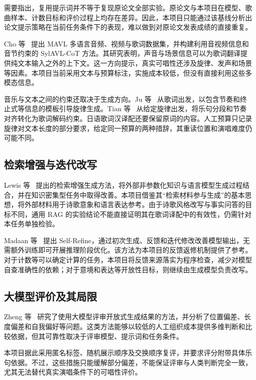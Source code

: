 \documentclass[12pt, a4paper]{ctexart}
\numberwithin{table}{section}
\numberwithin{figure}{section}
\begin{document}
需要指出，复用提示词并不等于复现原论文全部实验。原论文与本项目在模型、歌曲样本、计数目标和评价过程上均存在差异。因此，本项目只能通过该基线分析出论文提示策略在当前任务条件下的表现，难以做到对原论文发表成绩的直接重复。

Cho 等~\cite{cho-etal-2025-mavl} 提出 MAVL 多语言音频、视频与歌词数据集，并构建利用音视频信息和音节约束的 SylAVL-CoT 方法。其研究表明，声音与场景信息可以为歌词翻译提供纯文本输入之外的上下文。这一方向提示，真实可唱性还涉及旋律、发声和场景等因素。本项目当前采用文本与预算标注，实施成本较低，但没有直接利用这些多模态信息。

音乐与文本之间的约束还取决于生成方向。Ju 等~\cite{ju-etal-2021-telemelody} 从歌词出发，以包含节奏和终止式等信息的模板引导旋律生成。Tian 等~\cite{tian-etal-2023-unsupervised} 从给定旋律出发，将乐句分段和节奏对齐转化为歌词解码约束。日语歌词汉译配还要保留原词的内容。人工预算只记录旋律对文本长度的部分要求，给定同一预算的两种措辞，其重读位置和演唱难度仍可能不同。

\subsection{检索增强与迭代改写}
Lewis 等~\cite{lewis-etal-2020-rag} 提出的检索增强生成方法，将外部非参数化知识与语言模型生成过程结合，并在知识密集型任务中取得改善。本项目借鉴其“检索材料参与生成”的基本思想，将外部材料用于诗歌意象和语言表达参考。由于诗歌风格改写与事实问答的目标不同，通用 RAG 的实验结论不能直接证明其在歌词译配中的有效性，仍需针对本任务单独检验。

Madaan 等~\cite{madaan-etal-2023-selfrefine} 提出 Self-Refine，通过初次生成、反馈和迭代修改改善模型输出，无需额外训练即可开展推理阶段优化。该方法为本项目的反馈返修机制提供了参考。对于计数等可以确定计算的任务，本项目将反馈来源落实为程序检查，减少对模型自查准确性的依赖；对于意境和表达等开放性目标，则继续由生成模型负责改写。

\subsection{大模型评价及其局限}
Zheng 等~\cite{zheng-etal-2023-judging} 研究了使用大模型评审开放式生成结果的方法，并分析了位置偏差、长度偏差和自我偏好等问题。这类方法能够以较低的人工组织成本提供多维判断和比较依据，但其可靠性取决于评审模型、提示词和任务条件。

本项目据此采用匿名标签、随机展示顺序及交换顺序复评，并要求评分附带具体乐句依据。不过，这些措施只能缓解部分偏差，不能保证评审与人类判断完全一致，尤其无法替代真实演唱条件下的可唱性评价。
\end{document}

